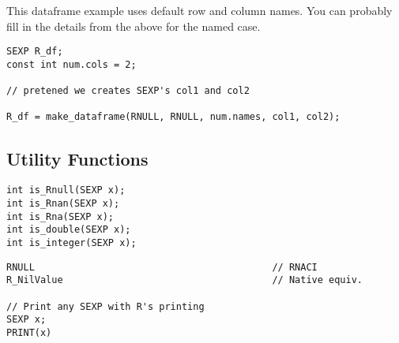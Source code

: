 This dataframe example uses \R default row and column names.  You can probably fill in the
details from the above for the named case.
\begin{lstlisting}[language=fanC,title=Dataframes]
SEXP R_df;
const int num.cols = 2;

// pretened we creates SEXP's col1 and col2

R_df = make_dataframe(RNULL, RNULL, num.names, col1, col2);
\end{lstlisting}



\subsection{Utility Functions}

\begin{lstlisting}[language=fanC,title=Testers]
int is_Rnull(SEXP x);
int is_Rnan(SEXP x);
int is_Rna(SEXP x);
int is_double(SEXP x);
int is_integer(SEXP x);
\end{lstlisting}



\begin{lstlisting}[language=fanC,title=Misc]
RNULL                                          // RNACI
R_NilValue                                     // Native equiv.

// Print any SEXP with R's printing
SEXP x;
PRINT(x)
\end{lstlisting}


